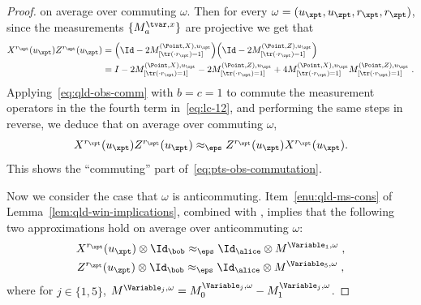 \begin{proof}
on average over commuting $\omega$. Then for every $\omega = (u_\xpt,u_\zpt,r_\xpt,r_\zpt)$, since the measurements $\{M^{\tvar,x}_a\}$ are projective we get that
\begin{align}
	X^{r_\xpt}(u_\xpt) Z^{r_\zpt}(u_\zpt) &= \Big ( \Id - 2 M^{(\Point,X),u_\xpt}_{[\tr(\cdot r_\xpt)=1]} \Big ) \Big ( \Id - 2 M^{(\Point,Z),u_\zpt}_{[\tr(\cdot r_\zpt)=1]}  \Big ) \notag\\
	&= I - 2 M^{(\Point,X),u_\xpt}_{[\tr(\cdot r_\xpt)=1]} - 2 M^{(\Point,Z),u_\zpt}_{[\tr(\cdot r_\zpt)=1]} + 4 M^{(\Point,X),u_\xpt}_{[\tr(\cdot r_\xpt)=1]} M^{(\Point,Z),u_\zpt}_{[\tr(\cdot r_\zpt)=1]}\;.\label{eq:lc-12}
\end{align}
Applying~\eqref{eq:qld-obs-comm} with $b = c = 1$ to commute the
measurement operators in the the fourth term
in~\eqref{eq:lc-12}, and performing the same steps in reverse, we deduce that on average over commuting $\omega$,
\[
	X^{r_\xpt}(u_\xpt) Z^{r_\zpt}(u_\zpt) \approx_\eps  Z^{r_\zpt}(u_\zpt) X^{r_\xpt}(u_\xpt).
\]
This shows the ``commuting'' part of~\eqref{eq:pts-obs-commutation}.

Now we consider the case that $\omega$ is anticommuting. Item~\ref{enu:qld-ms-cons} of Lemma~\ref{lem:qld-win-implications}, combined with , implies that the following two approximations hold on average over anticommuting $\omega$:
\begin{gather}
	X^{r_\xpt}(u_\xpt) \otimes \Id_\bob \approx_\eps \Id_\alice \otimes M^{\Variable_1,\omega} \;,\label{eq:lc-11a}\\
	Z^{r_\zpt}(u_\zpt) \otimes \Id_\bob \approx_\eps \Id_\alice \otimes M^{\Variable_5,\omega}\;,\label{eq:lc-11b}
\end{gather}
where for $j\in\{1,5\}$, $M^{\Variable_j,\omega} = M^{\Variable_j,\omega}_0-M^{\Variable_j,\omega}_1$.


\end{proof}
